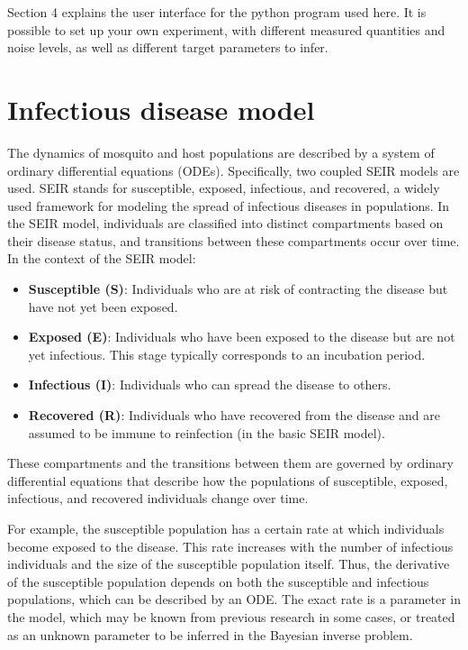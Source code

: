 \documentclass{article}
\begin{document}
Section 4 explains the user interface for the python program used here. It is possible to set up your own experiment, with different measured quantities and noise levels, as well as different target parameters to infer. 




\section{Infectious disease model}
The dynamics of mosquito and host populations are described by a system of ordinary differential equations (ODEs). Specifically, two coupled SEIR models are used. SEIR stands for susceptible, exposed, infectious, and recovered, a widely used framework for modeling the spread of infectious diseases in populations. In the SEIR model, individuals are classified into distinct compartments based on their disease status, and transitions between these compartments occur over time.
In the context of the SEIR model:
\begin{itemize}
    \item \textbf{Susceptible (S)}: Individuals who are at risk of contracting the disease but have not yet been exposed.
    \item \textbf{Exposed (E)}: Individuals who have been exposed to the disease but are not yet infectious. This stage typically corresponds to an incubation period.
    \item \textbf{Infectious (I)}: Individuals who can spread the disease to others.
    \item \textbf{Recovered (R)}: Individuals who have recovered from the disease and are assumed to be immune to reinfection (in the basic SEIR model).
\end{itemize}

These compartments and the transitions between them are governed by ordinary differential equations that describe how the populations of susceptible, exposed, infectious, and recovered individuals change over time. 

For example, the susceptible population has a certain rate at which individuals become exposed to the disease. This rate increases with the number of infectious individuals and the size of the susceptible population itself. Thus, the derivative of the susceptible population depends on both the susceptible and infectious populations, which can be described by an ODE. The exact rate is a parameter in the model, which may be known from previous research in some cases, or treated as an unknown parameter to be inferred in the Bayesian inverse problem.
\end{document}
